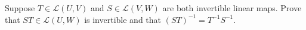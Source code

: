 \begin{question}
	\normalfont
	
	Suppose $T \in \mathcal{L}(U,V)$ and $S \in \mathcal{L}(V,W)$ are both invertible linear maps. Prove that $ST \in \mathcal{L}(U,W)$ is invertible and that $(ST)^{-1} = T^{-1}S^{-1}$. 
	
	
	\end{question}